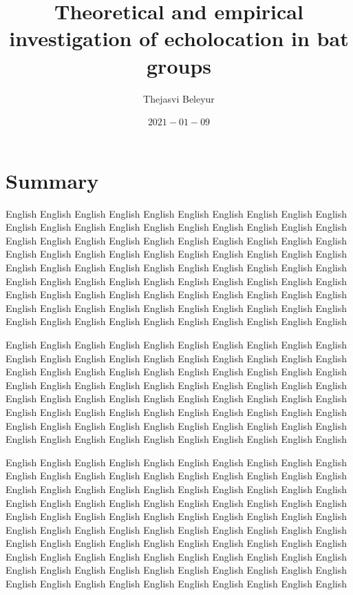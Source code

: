 \documentclass[
]{book}
\title{Theoretical and empirical investigation of echolocation in bat groups}
\author{Thejasvi Beleyur}
\date{\(2021-01-09\)}
\begin{document}
\maketitle

{
\setcounter{tocdepth}{1}
\tableofcontents
}
\hypertarget{summary}{%
\chapter*{Summary}\label{summary}}

English English English English English English English English English English English English English English English English English English English English English English English English English English English English English English English English English English English English English English English English English English English English English English English English English English English English English English English English English English English English English English English English English English English English English English English English English English English English English English English English English English English English English English English English English English

English English English English English English English English English English English English English English English English English English English English English English English English English English English English English English English English English English English English English English English English English English English English English English English English English English English English English English English English English English English English English English English English English English English English English English English English English English English English English English English English

English English English English English English English English English English English English English English English English English English English English English English English English English English English English English English English English English English English English English English English English English English English English English English English English English English English English English English English English English English English English English English English English English English English English English English English English English English English English English English English English English English English English English English English English English English
English English English English English English English English English English
\end{document}

